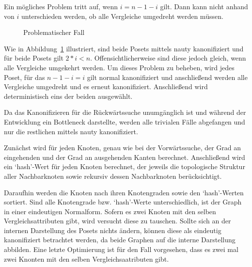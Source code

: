 \documentclass[10pt,journal,compsoc]{IEEEtran}
\begin{document}
Ein mögliches Problem tritt auf, wenn $i = n - 1 - i$ gilt.
Dann kann nicht anhand von $i$ unterschieden werden, ob alle Vergleiche umgedreht werden müssen.

\begin{figure}
  \centering
  \caption{Problematischer Fall}
  \label{fig:backward_canonify_problematic}
\end{figure}
Wie in Abbildung~\ref{fig:backward_canonify_problematic} illustriert, sind beide Posets mittels nauty kanonifiziert und für beide Posets gilt  $2 * i < n$.
Offensichtlicherweise sind diese jedoch gleich, wenn alle Vergleiche umgekehrt werden.
Um dieses Problem zu beheben, wird jedes Poset, für das $n - 1 - i = i$ gilt normal kanonifiziert und anschließend werden alle Vergleiche umgedreht und es erneut kanonifiziert.
Anschließend wird deterministisch eins der beiden ausgewählt.

Da das Kanonifizieren für die Rückwärtssuche unumgänglich ist und während der Entwicklung ein Bottleneck darstellte, werden alle trivialen Fälle abgefangen und nur die restlichen mittels nauty kanonifiziert.

Zunächst wird für jeden Knoten, genau wie bei der Vorwärtssuche, der Grad an eingehenden und der Grad an ausgehenden Kanten berechnet.
Anschließend wird ein `hash'-Wert für jeden Knoten berechnet, der jeweils die topologische Struktur aller Nachbarknoten sowie rekursiv dessen Nachbarknoten berücksichtigt.

Daraufhin werden die Knoten nach ihren Knotengraden sowie den `hash'-Werten sortiert.
Sind alle Knotengrade bzw. `hash'-Werte unterschiedlich, ist der Graph in einer eindeutigen Normalform.
Sofern es zwei Knoten mit den selben Vergleichsattributen gibt, wird versucht diese zu tauschen.
Sollte sich an der internen Darstellung des Posets nichts ändern, können diese als eindeutig kanonifiziert betrachtet werden, da beide Graphen auf die interne Darstellung abbilden.
Eine letzte Optimierung ist für den Fall vorgesehen, dass es zwei mal zwei Knonten mit den selben Vergleichsaatributen gibt.
\end{document}

